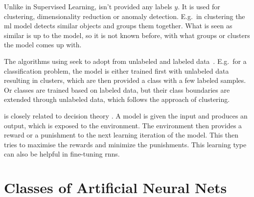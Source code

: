 Unlike in Supervised Learning,  isn't provided any labels $y$.
It is used for clustering, dimensionality reduction or anomaly detection. %
E.g.\ in clustering the \gls{ml} model detects similar objects and groups them together.
What is seen as similar is up to the model, so it is not known before, with what groups or clusters the model comes up with.

The algorithms using  seek to adopt from unlabeled and labeled data~\cite{van2020survey}.
E.g.\ for a classification problem, the model is either trained first with unlabeled data resulting in clusters, which are then provided a class with a few labeled samples.
Or classes are trained based on labeled data, but their class boundaries are extended through unlabeled data, which follows the approach of clustering.


 is closely related to decision theory \cite{ghahramani2003unsupervised}.
A model is given the input and produces an output, which is exposed to the environment.
The environment then provides a reward or a punishment to the next learning iteration of the model.
This then tries to maximise the rewards and minimize the punishments.
This learning type can also be helpful in fine-tuning \gls{rnn}s.

\section{Classes of Artificial Neural Nets}
\label{subsec:neural-net-classes}

